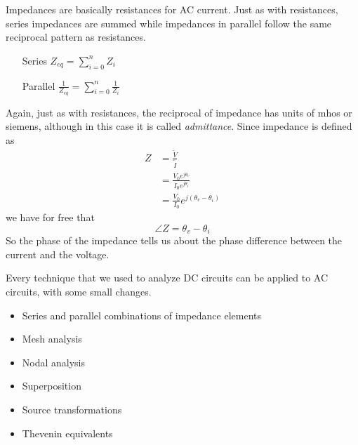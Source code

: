 \documentclass[nobib]{tufte-handout}
\begin{document}
Impedances are basically resistances for AC current. Just as with 
resistances, series impedances are summed while impedances in parallel 
follow the same reciprocal pattern as resistances. 
\begin{itemize}
    \item[Series] $Z_{eq} = \sum_{i=0}^{n} Z_i$
    \item[Parallel] $\frac{1}{Z_{eq}} = \sum_{i=0}^{n} \frac{1}{Z_i}$ 
\end{itemize}
Again, just as with resistances, the reciprocal of impedance has units 
of mhos or siemens, although in this case it is called \emph{admittance}. 
Since impedance is defined as 
\begin{align*}
    Z &= \frac{\tilde{V}}{\tilde{I}} \\
    &= \frac{V_0 e^{j\theta_v}}{I_0 e^{j \theta_i}}\\
    &= \frac{V_0}{I_0} e^{j(\theta_v-\theta_i)}
\end{align*}
we have for free that
\[\angle Z = \theta_v - \theta_i\]
So the phase of the impedance tells us about the phase difference between
the current and the voltage.

Every technique that we used to analyze DC circuits can be applied to
AC circuits, with some small changes. 
\begin{itemize}
    \item Series and parallel combinations of impedance elements
    \item Mesh analysis
    \item Nodal analysis
    \item Superposition
    \item Source transformations
    \item Thevenin equivalents
\end{itemize}
\end{document}
